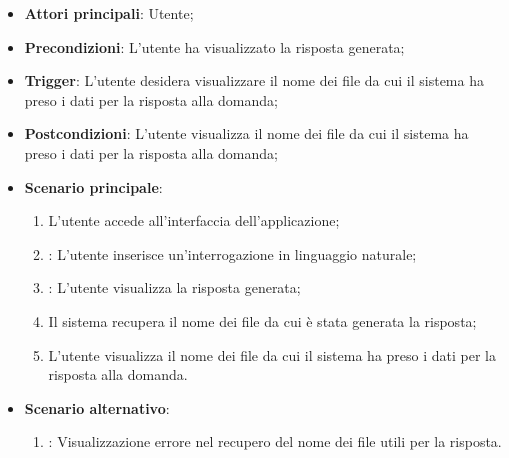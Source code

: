 \begin{itemize}
    \item \textbf{Attori principali}: Utente;
    \item \textbf{Precondizioni}: L'utente ha visualizzato la risposta generata;
    \item \textbf{Trigger}: L'utente desidera visualizzare il nome dei file da cui il sistema ha preso i dati per la risposta alla domanda;
    \item \textbf{Postcondizioni}: L'utente visualizza il nome dei file da cui il sistema ha preso i dati per la risposta alla domanda;
    \item \textbf{Scenario principale}:
    \begin{enumerate}
        \item L'utente accede all'interfaccia dell'applicazione;
        \item {}: L'utente inserisce un'interrogazione in linguaggio naturale;
        \item {}: L'utente visualizza la risposta generata;
        \item Il sistema recupera il nome dei file da cui è stata generata la risposta;
        \item L'utente visualizza il nome dei file da cui il sistema ha preso i dati per la risposta alla domanda.
    \end{enumerate}
    \item \textbf{Scenario alternativo}:
    \begin{enumerate}
        \item {}: Visualizzazione errore nel recupero del nome dei file utili per la risposta.
    \end{enumerate}
\end{itemize}

\hypertarget{UC14}{}
